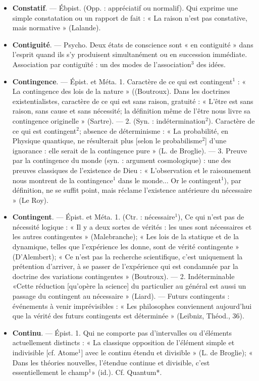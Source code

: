 \begin{itemize}[leftmargin=1cm, label=, itemsep=11pt]
\item {\bf Constatif}. — Ébpist. (Opp. : appréciatif
ou normalif). Qui exprime une
simple constatation ou un rapport
de fait : « La raison n’est pas constative, mais normative » (Lalande).

\item {\bf Contiguité}. — Psycho. Deux états de
conscience sont « en contiguité »
dans l'esprit quand ils s’y produisent simultanément ou en succession
immédiate. Association par contiguïté : un des modes de l’association$^3$ des idées.

\item {\bf Contingence}. — Épist. et Méta. 1. Caractère de ce qui est contingent$^1$ :
« La contingence des lois de la
nature » ((Boutroux). Dans les doctrines existentialistes, caractère de
ce qui est sans raison, gratuité :
« L’être est sans raison, sans cause et
sans nécessité; la définition même
de l’être nous livre sa contingence
originelle » (Sartre). — 2. (Syn. :
indétermination$^2$). Caractère de ce
qui est contingent$^2$; absence de déterminisme : « La probabilité, en
Physique quantique, ne résulterait
plus [selon le probabilisme$^2$] d’une
ignorance : elle serait de la contingence pure » (L. de Broglie). — 3.
Preuve par la contingence du monde
(syn. : argument cosmologique) : une
des preuves classiques de l’existence de Dieu : « L'observation et
le raisonnement nous montrent de
la contingence$^1$ dans le monde... Or
le contingent$^1$), par définition, ne se
suffit point, mais réclame l’existence antérieure du nécessaire » (Le
Roy).

\item {\bf Contingent}. — Épist. et Méta. 1. (Ctr. :
nécessaire$^1$), Ce qui n'est pas de nécessité logique : « Il y a deux sortes
de vérités : les unes sont nécessaires
et les autres contingentes » (Malebranche); « Les lois de la statique
et de la dynamique, telles que l’expérience les donne, sont de vérité
contingente » (D’Alembert); « Ce
n’est pas la recherche scientifique,
c’est uniquement la prétention d’arriver, à se passer de l'expérience qui
est condamnée par la doctrine des
variations contingentes »  (Boutroux). — 2. Indéterminable
«Cette réduction [qu’opère la science]
du particulier au général est aussi
un passage du contingent au nécessaire » (Liard). — Futurs contingents : événements à venir imprévisibles : « Les philosophes conviennent aujourd'hui que la vérité des
futurs contingents est déterminée »
(Leibniz, Théod., 36).

\item {\bf Continu}. — Épist. 1. Qui ne comporte
pas d'intervalles ou d'éléments
actuellement distincts : « La classique
opposition de l'élément simple
et indivisible [cf. Atome$^1$] avec le
continu étendu et divisible » (L. de
Broglie); « Dans les théories nouvelles, l'étendue continue et divisible, c'est essentiellement le champ$^1$»
(id.). Cf. Quantum*.


\end{itemize}

